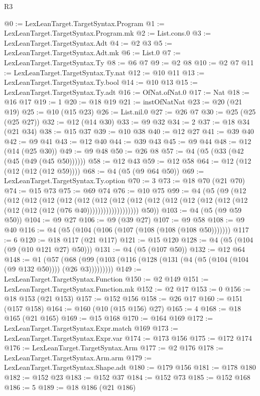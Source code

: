\begin{lexlean}{R3}
\begin{coremodule}
@0 := LexLeanTarget.TargetSyntax.Program
@1 := LexLeanTarget.TargetSyntax.Program.mk
@2 := List.cons.{0}
@3 := LexLeanTarget.TargetSyntax.Adt
@4 := @2 @3
@5 := LexLeanTarget.TargetSyntax.Adt.mk
@6 := List.{0}
@7 := LexLeanTarget.TargetSyntax.Ty
@8 := @6 @7
@9 := @2 @8
@10 := @2 @7
@11 := LexLeanTarget.TargetSyntax.Ty.nat
@12 := @10 @11
@13 := LexLeanTarget.TargetSyntax.Ty.bool
@14 := @10 @13
@15 := LexLeanTarget.TargetSyntax.Ty.adt
@16 := OfNat.ofNat.{0}
@17 := Nat
@18 := @16 @17
@19 := 1
@20 := @18 @19
@21 := instOfNatNat
@23 := @20 (@21 @19)
@25 := @10 (@15 @23)
@26 := List.nil.{0}
@27 := @26 @7
@30 := @25 (@25 (@25 @27))
@32 := @12 (@14 @30)
@33 := @9 @32
@34 := 2
@37 := @18 @34 (@21 @34)
@38 := @15 @37
@39 := @10 @38
@40 := @12 @27
@41 := @39 @40
@42 := @9 @41
@43 := @12 @40
@44 := @39 @43
@45 := @9 @44
@48 := @12 (@14 (@25 @30))
@49 := @9 @48
@50 := @26 @8
@57 := @4 (@5 (@33 (@42 (@45 (@49 (@45 @50))))))
@58 := @12 @43
@59 := @12 @58
@64 := @12 (@12 (@12 (@12 (@12 @59))))
@68 := @4 (@5 (@9 @64 @50))
@69 := LexLeanTarget.TargetSyntax.Ty.option
@70 := 3
@73 := @18 @70 (@21 @70)
@74 := @15 @73
@75 := @69 @74
@76 := @10 @75
@99 := @4
    (@5
      (@9
        (@12
          (@12
            (@12
              (@12
                (@12
                  (@12
                    (@12
                      (@12
                        (@12
                          (@12 (@12 (@12 (@12 (@12 (@12 (@12 (@12 (@12 (@76 @40)))))))))))))))))))
        @50))
@103 := @4 (@5 (@9 @59 @50))
@104 := @9 @27
@106 := @9 (@39 @27)
@107 := @9 @58
@108 := @9 @40
@116 := @4 (@5 (@104 (@106 (@107 (@108 (@108 (@108 @50)))))))
@117 := 6
@120 := @18 @117 (@21 @117)
@121 := @15 @120
@128 := @4 (@5 (@104 (@9 (@10 @121 @27) @50)))
@131 := @4 (@5 (@107 @50))
@132 := @12 @64
@148 := @1
    (@57 (@68 (@99 (@103 (@116 (@128 (@131 (@4 (@5 (@104 (@104 (@9 @132 @50)))) (@26 @3)))))))))
@149 := LexLeanTarget.TargetSyntax.Function
@150 := @2 @149
@151 := LexLeanTarget.TargetSyntax.Function.mk
@152 := @2 @17
@153 := 0
@156 := @18 @153 (@21 @153)
@157 := @152 @156
@158 := @26 @17
@160 := @151 (@157 @158)
@164 := @160 (@10 (@15 @156) @27)
@165 := 4
@168 := @18 @165 (@21 @165)
@169 := @15 @168
@170 := @164 @169
@172 := LexLeanTarget.TargetSyntax.Expr.match @169
@173 := LexLeanTarget.TargetSyntax.Expr.var
@174 := @173 @156
@175 := @172 @174
@176 := LexLeanTarget.TargetSyntax.Arm
@177 := @2 @176
@178 := LexLeanTarget.TargetSyntax.Arm.arm
@179 := LexLeanTarget.TargetSyntax.Shape.adt
@180 := @179 @156
@181 := @178 @180
@182 := @152 @23
@183 := @152 @37
@184 := @152 @73
@185 := @152 @168
@186 := 5
@189 := @18 @186 (@21 @186)

\end{coremodule}
\end{lexlean}
